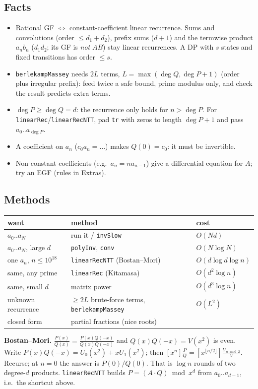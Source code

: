 	\subsection{Facts}
	\begin{itemize}[nosep,leftmargin=*]
	\item Rational GF $\iff$ constant-coefficient linear recurrence. Sums and convolutions (order $\le d_1+d_2$), prefix sums ($d+1$) and the termwise product $a_nb_n$ ($d_1d_2$; its GF is \emph{not} $AB$) stay linear recurrences. A DP with $s$ states and fixed transitions has order $\le s$.
	\item \texttt{berlekampMassey} needs $2L$ terms, $L=\max(\deg Q,\deg P+1)$ (order plus irregular prefix): feed twice a safe bound, prime modulus only, and check the result predicts extra terms.
	\item $\deg P\ge\deg Q=d$: the recurrence only holds for $n>\deg P$. For \texttt{linearRec}/\texttt{linearRecNTT}, pad \texttt{tr} with zeros to length $\deg P+1$ and pass $a_0..a_{\deg P}$.
	\item A coefficient on $a_n$ ($c_0a_n=\dots$) makes $Q(0)=c_0$: it must be invertible.
	\item Non-constant coefficients (e.g.\ $a_n=na_{n-1}$) give a differential equation for $A$; try an EGF (rules in Extras).
	\end{itemize}

	\subsection{Methods}
	\begin{center}\small\renewcommand{\arraystretch}{1.3}
	\begin{tabular}{@{}L{2.75cm}@{\ \ }L{3.65cm}@{\ \ }l@{}}
	want & method & cost \\ \hline
	$a_0..a_N$ & run it / \texttt{invSlow} & $O(Nd)$ \\
	$a_0..a_N$, large $d$ & \texttt{polyInv}, \texttt{conv} & $O(N\log N)$ \\
	one $a_n$, $n\le10^{18}$ & \texttt{linearRecNTT} (Bostan--Mori) & $O(d\log d\log n)$ \\
	same, any prime & \texttt{linearRec} (Kitamasa) & $O(d^2\log n)$ \\
	same, small $d$ & matrix power & $O(d^3\log n)$ \\
	unknown recurrence & $\ge2L$ brute-force terms, \texttt{berlekampMassey} & $O(L^2)$ \\
	closed form & partial fractions (nice roots) & \\
	\end{tabular}
	\end{center}
	\textbf{Bostan--Mori.} $\frac{P(x)}{Q(x)}=\frac{P(x)Q(-x)}{Q(x)Q(-x)}$ and $Q(x)Q(-x)=V(x^2)$ is even. Write $P(x)Q(-x)=U_0(x^2)+xU_1(x^2)$; then $[x^n]\frac PQ=[x^{\lfloor n/2\rfloor}]\frac{U_{n\bmod2}}{V}$. Recurse; at $n=0$ the answer is $P(0)/Q(0)$. That is $\log n$ rounds of two degree-$d$ products. \texttt{linearRecNTT} builds $P=(A\cdot Q)\bmod x^d$ from $a_0..a_{d-1}$, i.e.\ the shortcut above.

